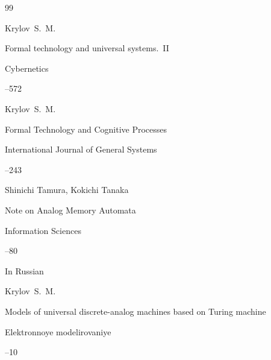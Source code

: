 \begin{thebibliography}{99}








\by Krylov~S.~M.

\paper Formal technology and universal systems.~II

\jour Cybernetics 




--572





\by Krylov~S.~M.

\paper Formal Technology and Cognitive Processes

\jour 

    International Journal of General Systems




--243





\by Shinichi Tamura, Kokichi Tanaka

\paper Note on Analog Memory Automata

\jour Information Sciences



--80





\lang In Russian

\by Krylov~S.~M.

\paper Models of universal discrete-analog machines based on Turing machine

\jour Elektronnoye modelirovaniye



–10






\end{thebibliography}
